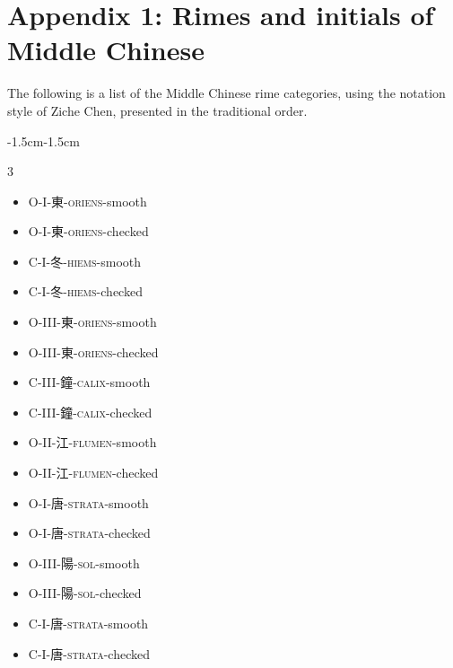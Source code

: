 \chapter*{Appendix 1: Rimes and initials of Middle Chinese}


The following is a list of the Middle Chinese rime categories, using the notation style of Ziche Chen, presented in the traditional order.  

\begin{adjustwidth}{-1.5cm}{-1.5cm} %

\begin{multicols}{3} %

\begin{itemize}[label={}, leftmargin=*]
  \item O-I-東-\textsc{oriens}-smooth \hfill {} 
  \item O-I-東-\textsc{oriens}-checked \hfill {}
  \item C-I-冬-\textsc{hiems}-smooth \hfill {} 
  \item C-I-冬-\textsc{hiems}-checked \hfill {} 

  \item O-III-東-\textsc{oriens}-smooth \hfill {}
  \item O-III-東-\textsc{oriens}-checked \hfill {}
  \item C-III-鐘-\textsc{calix}-smooth \hfill {}
  \item C-III-鐘-\textsc{calix}-checked \hfill {}

  \item O-II-江-\textsc{flumen}-smooth \hfill {}
  \item O-II-江-\textsc{flumen}-checked \hfill {}
  \item O-I-唐-\textsc{strata}-smooth \hfill {}
  \item O-I-唐-\textsc{strata}-checked
\hfill {}
  \item O-III-陽-\textsc{sol}-smooth \hfill {}
  \item O-III-陽-\textsc{sol}-checked \hfill {}
  \item C-I-唐-\textsc{strata}-smooth \hfill {}
  \item C-I-唐-\textsc{strata}-checked \hfill {}


\end{itemize}
\end{multicols}
\end{adjustwidth}
